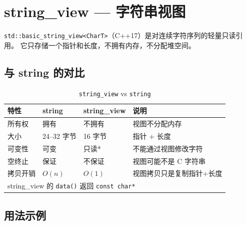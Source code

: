 \documentclass[12pt,a4paper,fontset=fandol]{ctexbook}
\newcommand{\cpp}[1]{C++#1}
\newcommand{\Tp}[1]{\texttt{#1}}
\begin{document}
\chapter{string\_view --- 字符串视图}

\Tp{std::basic\_string\_view<CharT>}（\cpp{17}）是对连续字符序列的轻量只读引用。
它只存储一个指针和长度，不拥有内存，不分配堆空间。

\section{与 string 的对比}

\begin{table}[htbp]
\centering
\caption{\Tp{string\_view} vs \Tp{string}}
\begin{tabularx}{\textwidth}{l l l X}
\toprule
\textbf{特性} & \textbf{string} & \textbf{string\_view} & \textbf{说明} \\
\midrule
所有权   & 拥有 & 不拥有 & 视图不分配内存 \\
大小     & 24--32 字节 & 16 字节 & 指针 + 长度 \\
可变性   & 可变 & 只读* & 不能通过视图修改字符 \\
空终止   & 保证 & 不保证 & 视图可能不是 C 字符串 \\
拷贝开销 & $O(n)$ & $O(1)$ & 视图拷贝只是复制指针+长度 \\
\bottomrule
\multicolumn{4}{l}{\small * string\_view 的 \Tp{data()} 返回 \texttt{const char*}}
\end{tabularx}
\end{table}

\section{用法示例}
\end{document}
